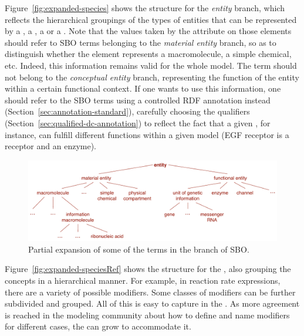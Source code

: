\begin{blockChanged}

Figure~\vref{fig:expanded-species} shows the structure for the \emph{entity} branch, which reflects the hierarchical groupings of the types of entities that can be represented by a , a , a  or a . Note that the values taken by the  attribute on those elements should refer to SBO terms belonging to the \emph{material entity} branch, so as to distinguish whether the element represents a macromolecule, a simple chemical, etc. Indeed, this information remains valid for the whole model. The term should not belong to the \emph{conceptual entity} branch, representing the function of the entity within a certain functional context. If one wants to use this information, one should refer to the SBO terms using a controlled RDF annotation instead (Section~\ref{sec:annotation-standard}), carefully choosing the qualifiers (Section~\ref{sec:qualified-dc-annotation}) to reflect the fact that a given , for instance, can fulfill different functions within a given model (\eg EGF receptor is a receptor and an enzyme).

\begin{figure}[htb]
  \centering
  \vspace*{-1ex}
  \includegraphics[scale = 0.8]{figs/sbo-entity}
  \caption{Partial expansion of some of the terms in the
     branch of SBO.}
  \label{fig:expanded-species}
\end{figure}

Figure~\vref{fig:expanded-speciesRef} shows the structure
for the , also grouping the concepts in a hierarchical manner. For example, in reaction
rate expressions, there are a variety of possible modifiers.  Some
classes of modifiers can be further subdivided and grouped.  All
of this is easy to capture in the .  As more agreement is
reached in the modeling community about how to define and name
modifiers for different cases, the  can grow to accommodate it.

\end{blockChanged}

